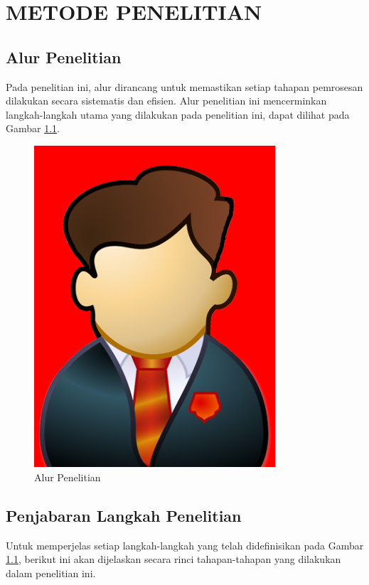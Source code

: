 \newpage
\chapter{METODE PENELITIAN} \label{Bab III}

\section{Alur Penelitian} \label{III.Alur}
Pada penelitian ini, alur dirancang untuk memastikan setiap tahapan pemrosesan dilakukan secara sistematis dan efisien. Alur penelitian ini mencerminkan langkah-langkah utama yang dilakukan pada penelitian ini, dapat dilihat pada Gambar \ref{fig:3.alur}. \par

\begin{figure}[H] %
    \centering
    \includegraphics[width=0.8\textwidth]{figure/samplephoto.jpg}
    \caption{Alur Penelitian}
    \label{fig:3.alur}
\end{figure}

\section{Penjabaran Langkah Penelitian} \label{III.Jabar Alur}
Untuk memperjelas setiap langkah-langkah yang telah didefinisikan pada Gambar \ref{fig:3.alur}, berikut ini akan dijelaskan secara rinci tahapan-tahapan yang dilakukan dalam penelitian ini.


